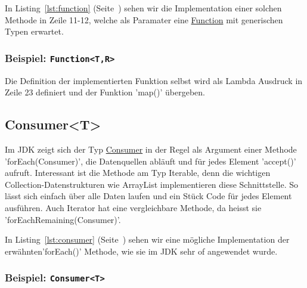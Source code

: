 In Listing~\ref{lst:function} (Seite~\pageref{lst:function}) sehen wir die Implementation
einer solchen Methode in Zeile 11-12, welche als Paramater eine
\href{https://docs.oracle.com/en/java/javase/11/docs/api/java.base/java/util/function/Function.html}
{Function} mit generischen Typen erwartet.


\begin{frame}[fragile]
    \frametitle<presentation>{Beispiel: \texttt{Function<T,R>}}

\end{frame}

\mode*
{}

Die Definition der implementierten Funktion selbst wird als Lambda Ausdruck in
Zeile 23 definiert und der Funktion 'map()' übergeben.


\subsection{Consumer<T>}
\label{subsec:consumer}

Im JDK zeigt sich der Typ
\href{https://docs.oracle.com/en/java/javase/11/docs/api/java.base/java/util/function/Consumer.html}
{Consumer}
in der Regel als Argument einer Methode 'forEach(Consumer)', die Datenquellen abläuft und für
jedes Element 'accept()' aufruft. Interessant ist die Methode am Typ Iterable, denn die
wichtigen Collection-Datenstrukturen wie ArrayList implementieren diese Schnittstelle.
So lässt sich einfach über alle Daten laufen und ein Stück Code für jedes Element
ausführen. Auch Iterator hat eine vergleichbare Methode, da heisst sie 'forEachRemaining(Consumer)'.

In Listing~\ref{lst:consumer} (Seite~\pageref{lst:consumer}) sehen wir eine mögliche Implementation
der erwähnten'forEach()' Methode, wie sie im JDK sehr of angewendet wurde.

\begin{frame}[fragile]
    \frametitle<presentation>{Beispiel: \texttt{Consumer<T>}}

\end{frame}

\mode*
{}
